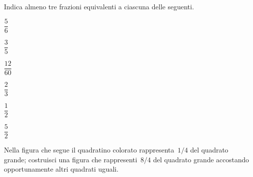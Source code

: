 \begin{esercizio}
 \label{ese:3.7}
 Indica almeno tre frazioni equivalenti a ciascuna delle seguenti.
 \begin{multicols}{6}
 \begin{enumeratea}
 	\item \(\dfrac{5}{6}\)
 	\item \(\dfrac{3}{5}\)
 	\item \(\dfrac{12}{60}\)
 	\item \(\dfrac{2}{3}\)
 	\item \(\dfrac{1}{2}\)
 	\item \(\dfrac{5}{2}\)
 \end{enumeratea}
 \end{multicols}
\end{esercizio}

\begin{esercizio}
 \label{ese:3.8}
Nella figura che segue il quadratino colorato rappresenta~\(1/4\) del quadrato 
grande; costruisci una figura che rappresenti~\(8/4\) del quadrato grande 
accostando opportunamente altri quadrati uguali.
 \begin{center}
 
 \end{center}
\end{esercizio}

